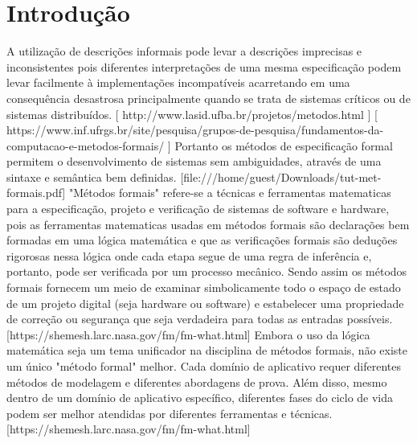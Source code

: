 \section{Introdução}

A utilização de descrições informais pode levar a descrições imprecisas e inconsistentes pois diferentes interpretações de uma mesma especificação podem levar facilmente à implementações incompatíveis acarretando em uma consequência desastrosa principalmente quando se trata de sistemas críticos ou de sistemas distribuídos. 
[ http://www.lasid.ufba.br/projetos/metodos.html ] [ https://www.inf.ufrgs.br/site/pesquisa/grupos-de-pesquisa/fundamentos-da-computacao-e-metodos-formais/ ]
\cite{teste}
Portanto os métodos de especificação formal permitem o desenvolvimento de sistemas sem ambiguidades, através de uma sintaxe e semântica bem definidas.  
[file:///home/guest/Downloads/tut-met-formais.pdf]
\cite{teste}
"Métodos formais" refere-se a técnicas e ferramentas matematicas para a especificação, projeto e verificação de sistemas de software e hardware, pois as ferramentas matematicas usadas em métodos formais são declarações bem formadas em uma lógica matemática e que as verificações formais são deduções rigorosas nessa lógica onde cada etapa segue de uma regra de inferência e, portanto, pode ser verificada por um processo mecânico. Sendo assim os métodos formais fornecem um meio de examinar simbolicamente todo o espaço de estado de um projeto digital (seja hardware ou software) e estabelecer uma propriedade de correção ou segurança que seja verdadeira para todas as entradas possíveis.
[https://shemesh.larc.nasa.gov/fm/fm-what.html]
\cite{teste}
Embora o uso da lógica matemática seja um tema unificador na disciplina de métodos formais, não existe um único "método formal" melhor. Cada domínio de aplicativo requer diferentes métodos de modelagem e diferentes abordagens de prova. Além disso, mesmo dentro de um domínio de aplicativo específico, diferentes fases do ciclo de vida podem ser melhor atendidas por diferentes ferramentas e técnicas.
[https://shemesh.larc.nasa.gov/fm/fm-what.html]
\cite{teste}
